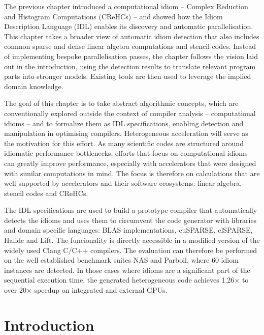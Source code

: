 
    The previous chapter introduced a computational idiom --
    Complex Reduction and Histogram Computations (CReHCs) -- and showed how the
    Idiom Description Language (IDL) enables its discovery and automatic
    parallelisation.
    This chapter takes a broader view of automatic idiom detection that also
    includes common sparse and dense linear algebra computations and stencil
    codes.
    Instead of implementing bespoke parallelisation passes, the chapter
    follows the vision laid out in the introduction, using the detection results
    to translate relevant program parts into stronger models.
    Existing tools are then used to leverage the implied domain knowledge.

    The goal of this chapter is to take abstract algorithmic concepts, which are
    conventionally explored outside the context of compiler analysis --
    computational idioms -- and to formalize them as IDL specifications,
    enabling detection and manipulation in optimising compilers.
    Heterogeneous acceleration will serve as the motivation for this effort.
    As many scientific codes are structured around idiomatic performance
    bottlenecks, efforts that focus on computational idioms can greatly
    improve performance, especially with accelerators that were designed
    with similar computations in mind.
    The focus is therefore on calculations that are well supported by
    accelerators and their software ecosystems: linear algebra,
    stencil codes and CReHCs.

    The IDL specifications are used to build a prototype compiler that
    automatically detects the idioms and uses them to circumvent the code
    generator with libraries and domain specific languages:
    BLAS implementations, cuSPARSE, clSPARSE, Halide and Lift.
    The funcionality is directly accessible in a modified version of the widely
    used Clang C/C++ compilers.
    The evaluation can therefore be performed on the well established benchmark
    suites NAS and Parboil, where 60 idiom instances are detected.
    In those cases where idioms are a significant part of the sequential
    execution time, the generated heterogeneous code achieves 1.26$\times$ to
    over 20$\times$ speedup on integrated and external GPUs.

\section{Introduction}

